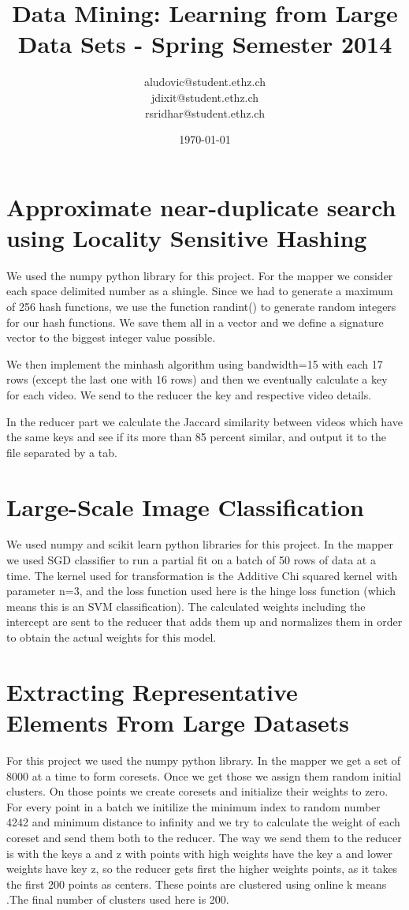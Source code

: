 \documentclass[a4paper, 11pt]{article}
\title{Data Mining: Learning from Large Data Sets - Spring Semester 2014}
\author{aludovic@student.ethz.ch\\ jdixit@student.ethz.ch\\ rsridhar@student.ethz.ch\\}
\date{\today}
\begin{document}
\maketitle

\section{Approximate near-duplicate search using Locality Sensitive Hashing} 

We used the numpy python library for this project. For the mapper we consider each space delimited number as a shingle. Since we had to generate a maximum
of 256 hash functions, we use the function randint() to generate random integers for our hash functions. We save them all in a vector and we define a signature
vector to the biggest integer value possible.

We then implement the minhash algorithm using bandwidth=15 with each 17 rows (except the last one with 16 rows) and then we eventually calculate a key for
each video. We send to the reducer the key and respective video details.

In the reducer part we calculate the Jaccard similarity between videos which have the same keys and see if its more than 85 percent similar, and output
it to the file separated by a tab.

\section{Large-Scale Image Classification}

We used numpy and scikit learn python libraries for this project. In the mapper we used SGD classifier to run a partial fit on a batch of 50 rows of data
at a time. The kernel used for transformation is the Additive Chi squared kernel with parameter n=3, and the loss function used here
is the hinge loss function (which means this is an SVM classification). The calculated weights including the intercept are sent to the reducer that adds them up and normalizes them in order
to obtain the actual weights for this model.

\section{Extracting Representative Elements From Large Datasets}

For this project we used the numpy python library. In the mapper we get a set of 8000 at a time to form coresets. Once we get those
we assign them random initial clusters. On those points we create coresets and initialize their weights to zero. For every point
in a batch we initilize the minimum index to random number 4242 and minimum distance to infinity and we try to calculate the weight of each coreset
and send them both to the reducer. The way we send them to the reducer is with the keys a and z with points with high weights have
the key a and lower weights have key z, so the reducer gets first the higher weights points, as it takes the first 200 points as centers.
These points are clustered using online k means .The final number of clusters used here is 200.
\end{document}
